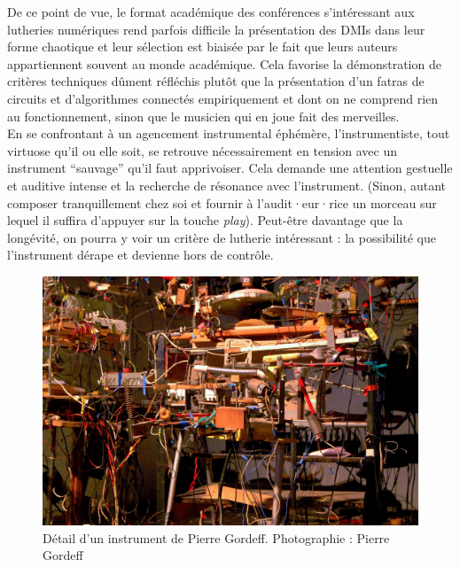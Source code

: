 \indent De ce point de vue, le format académique des conférences s'intéressant aux lutheries numériques rend parfois difficile la présentation des \glspl{DMI} dans leur forme chaotique et leur sélection est biaisée par le fait que leurs auteurs appartiennent souvent au monde académique. Cela favorise la démonstration de critères techniques dûment réfléchis plutôt que la présentation d'un fatras de circuits et d'algorithmes connectés empiriquement et dont on ne comprend rien au fonctionnement, sinon que le musicien qui en joue fait des merveilles.\\
\indent En se confrontant à un agencement instrumental éphémère, l'instrumentiste, tout virtuose qu'il ou elle soit, se retrouve nécessairement en tension avec un instrument ``sauvage'' qu'il faut apprivoiser. Cela demande une attention gestuelle et auditive intense et la recherche de résonance avec l'instrument. (Sinon, autant composer tranquillement chez soi et fournir à l’audit·eur·rice un morceau sur lequel il suffira d'appuyer sur la touche \textit{play}). Peut-être davantage que la longévité, on pourra y voir un critère de lutherie intéressant : la possibilité que l'instrument dérape et devienne hors de contrôle.

\begin{figure}[!htbp]
	\captionsetup{format=plain}%
	\includegraphics[width=\textwidth]{gfx/02_ephemeral/PierreGordeff.jpg}
	\caption[Détail d'un instrument de Pierre Gordeff]{Détail d'un instrument de Pierre Gordeff. Photographie : Pierre Gordeff}
	\label{fig:ephemeral:Gordeff}
\end{figure}

